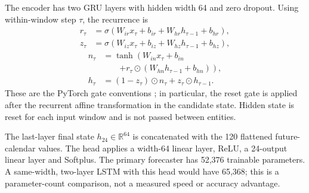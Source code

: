 The encoder has two GRU layers with hidden width 64 and zero dropout. Using within-window step $\tau$, the recurrence is
\begingroup\small
\begin{equation}\begin{aligned}
r_\tau&=\sigma(W_{ir}x_\tau+b_{ir}+W_{hr}h_{\tau-1}+b_{hr}),\\
z_\tau&=\sigma(W_{iz}x_\tau+b_{iz}+W_{hz}h_{\tau-1}+b_{hz}),
\end{aligned}\label{eq:gates}\end{equation}
\endgroup
\begin{equation}\begin{aligned}
n_\tau&=\tanh\!\left(W_{in}x_\tau+b_{in}\right.\\
&\qquad\left.+r_\tau\odot(W_{hn}h_{\tau-1}+b_{hn})\right),\\
h_\tau&=(1-z_\tau)\odot n_\tau+z_\tau\odot h_{\tau-1}.
\end{aligned}\label{eq:hidden}\end{equation}
These are the PyTorch gate conventions \cite{pytorch211}; in particular, the reset gate is applied after the recurrent affine transformation in the candidate state. Hidden state is reset for each input window and is not passed between entities.

The last-layer final state $h_{24}\in\mathbb R^{64}$ is concatenated with the 120 flattened future-calendar values. The head applies a width-64 linear layer, ReLU, a 24-output linear layer and Softplus. The primary forecaster has 52,376 trainable parameters. A same-width, two-layer LSTM with this head would have 65,368; this is a parameter-count comparison, not a measured speed or accuracy advantage.

